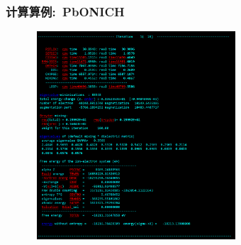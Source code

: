 \begin{frame}
	\frametitle{计算算例:~\textrm{PbONICH}}
\begin{figure}[h!]
\centering
\vskip -0.21in
\includegraphics[height=3.05in,width=3.00in,viewport=0 0 1000 1152,clip]{Figures/VASP_huge_Ningde-PbONICH_OUTCAR.png}
\label{VASP_Model-3}
\end{figure} 
\end{frame}

